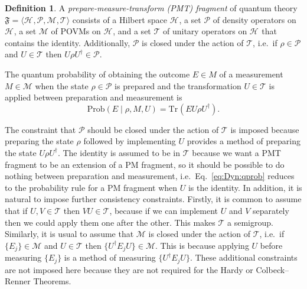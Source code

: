 \documentclass[DIV=calc,paper=a4,fontsize=11pt,twocolumn]{scrartcl} %
\theoremstyle{definition}
\newtheorem{definition}{Definition}[section]
\theoremstyle{plain}
\newcommand{\Hilb}[1][]{\ensuremath{\mathcal{H}_{#1}}}
\newcommand{\Tr}[2][]{\ensuremath{\text{Tr}_{#1} \left ( #2 \right )}}
\begin{document}
\begin{definition}
A \emph{prepare-measure-transform (PMT) fragment} of quantum theory
$\mathfrak{F} = \langle \Hilb, \mathcal{P}, \mathcal{M}, \mathcal{T}
\rangle$ consists of a Hilbert space $\Hilb$, a set $\mathcal{P}$ of
density operators on $\Hilb$, a set $\mathcal{M}$ of POVMs on
$\Hilb$, and a set $\mathcal{T}$ of unitary operators on $\Hilb$
that contains the identity.  Additionally, $\mathcal{P}$ is closed
under the action of $\mathcal{T}$, i.e.\ if $\rho \in \mathcal{P}$
and $U \in \mathcal{T}$ then $U \rho U^{\dagger} \in \mathcal{P}$.

The quantum probability of obtaining the outcome $E \in M$ of a
measurement $M \in \mathcal{M}$ when the state $\rho \in
\mathcal{P}$ is prepared and the transformation $U \in \mathcal{T}$
is applied between preparation and measurement is
\begin{equation}
\label{eq:Dyn:qprob}
\text{Prob} \left ( E \middle | \rho, M, U \right ) = \Tr{E U \rho
U^{\dagger}}.
\end{equation}
\end{definition}

The constraint that $\mathcal{P}$ should be closed under the action of
$\mathcal{T}$ is imposed because preparing the state $\rho$ followed
by implementing $U$ provides a method of preparing the state $U \rho
U^{\dagger}$.  The identity is assumed to be in $\mathcal{T}$ because
we want a PMT fragment to be an extension of a PM fragment, so it
should be possible to do nothing between preparation and measurement,
i.e.\ Eq.~\eqref{eq:Dyn:qprob} reduces to the probability rule for a
PM fragment when $U$ is the identity.  In addition, it is natural to
impose further consistency constraints. Firstly, it is common to
assume that if $U,V \in \mathcal{T}$ then $VU \in \mathcal{T}$,
because if we can implement $U$ and $V$ separately then we could apply
them one after the other.  This makes $\mathcal{T}$ a semigroup.
Similarly, it is usual to assume that $\mathcal{M}$ is closed under
the action of $\mathcal{T}$, i.e.\ if $\{E_j\} \in \mathcal{M}$ and $U
\in \mathcal{T}$ then $\{U^{\dagger} E_j U\} \in \mathcal{M}$.  This
is because applying $U$ before measuring $\{E_j\}$ is a method of
measuring $\{ U^{\dagger} E_j U \}$.  These additional constraints are
not imposed here because they are not required for the Hardy or
Colbeck--Renner Theorems.
\end{document}
